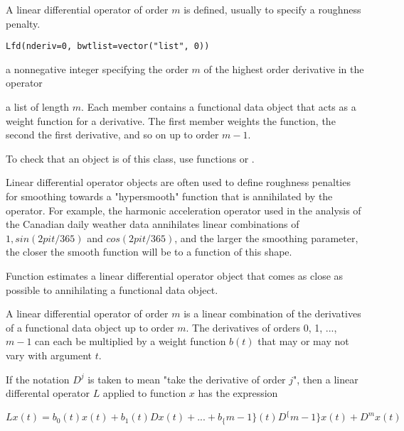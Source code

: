\documentclass{article}
\begin{document}
\begin{Description}\relax
A linear differential operator of order $m$ is defined,
usually to specify a roughness penalty.
\end{Description}
\begin{Usage}
\begin{verbatim}
Lfd(nderiv=0, bwtlist=vector("list", 0))
\end{verbatim}
\end{Usage}
\begin{Arguments}
\begin{ldescription}
\item[\code{nderiv}] a nonnegative integer specifying the order $m$ of the
highest order derivative in the operator

\item[\code{bwtlist}] a list of length $m$.  Each member contains a
functional data object that acts as a weight function for a
derivative.  The first member weights the function, the
second the first derivative, and so on up to order $m-1$.

\end{ldescription}
\end{Arguments}
\begin{Details}\relax
To check that an object is of this class, use functions
 or .

Linear differential operator objects are often used to
define roughness penalties for smoothing towards a
"hypersmooth" function that is annihilated by the operator.
For example, the harmonic acceleration operator used in the
analysis of the Canadian daily weather data annihilates linear
combinations of $1, sin(2 pi t/365)$ and $cos(2 pi t/365)$,
and the larger the smoothing parameter, the closer the smooth
function will be to a function of this shape.

Function  estimates a linear differential
operator object that comes as close as possible to annihilating
a functional data object.

A linear differential operator of order $m$ is a
linear combination of the derivatives of a functional
data object up to order $m$.  The derivatives of
orders 0, 1, ..., $m-1$ can each be multiplied
by a weight function $b(t)$ that may or may not vary with
argument $t$.

If the notation $D^j$ is taken to
mean "take the derivative of order $j$", then a linear
differental operator $L$ applied to function $x$
has the expression

$Lx(t) = b_0(t) x(t) + b_1(t)Dx(t) + ... + b_\{m-1\}(t) D^\{m-1\} x(t)
+ D^mx(t)$
\end{Details}
\end{document}
